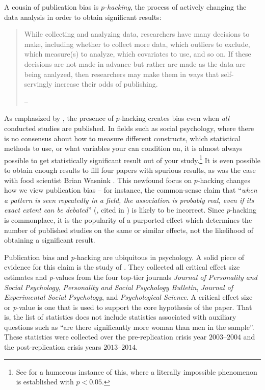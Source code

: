 A cousin of publication bias is \emph{$p$-hacking}, the process of actively changing the data analysis in order to obtain significant results:
\begin{quote}
While collecting and analyzing data, researchers have many decisions to make, including whether to collect more data, which outliers to exclude, which measure(s) to analyze, which covariates to use, and so on. If these decisions are not made in advance but rather are made as the data are being analyzed, then researchers may make them in ways that self-servingly increase their odds of publishing. 
\begin{flushright}
-- \textcite[p. 1]{simonsohn_p-curve:_2014}
\par\end{flushright}
\end{quote}
As emphasized by \textcite{simonsohn_p-curve:_2014}, the presence of $p$-hacking creates bias even when \emph{all} conducted studies are published. In fields such as social psychology, where there is no consensus about how to measure different constructs, which statistical methods to use, or what variables your can condition on, it is almost always possible to get statistically significant result out of your study.\footnote{See \textcite[p. 2, study 2]{simmons_false-positive_2011} for a humorous instance of this, where a literally impossible phenomenon is established with $p<0.05$.} It is even possible to obtain enough results to fill four papers with spurious results, as was the case with food scientist Brian Wasnink \parencite{van_der_zee_statistical_2017}. This newfound focus on $p$-hacking changes how we view publication bias -- for instance, the common-sense claim that ``\emph{when a pattern is seen repeatedly in a field, the association is probably real, even if its exact extent can be debated}\textquotedblright{} (\textcite{ioannidis_why_2008}, cited in \textcite{simonsohn_p-curve:_2014}) is likely to be incorrect. Since $p$-hacking is commonplace, it is the popularity of a purported effect which determines the number of published studies on the same or similar effects, not the likelihood of obtaining a significant result.

Publication bias and \emph{p}-hacking are ubiquitous in psychology. A solid piece of evidence for this claim is the study of \textcite{Motyl2017-dx}. They collected all critical effect size estimates and \emph{p}-values from the four top-tier journals \emph{Journal of Personality and Social Psychology}, \emph{Personality and Social Psychology Bulletin}, \emph{Journal of Experimental Social Psychology}, and \emph{Psychological Science}. A critical effect size or \emph{p}-value is one that is used to support the core hypothesis of the paper. That is, the list of statistics does not include statistics associated with auxiliary questions such as ``are there significantly more woman than men in the sample''. These statistics were collected over the pre-replication crisis year
$2003$--$2004$ and the post-replication crisis years $2013$--$2014$. 

